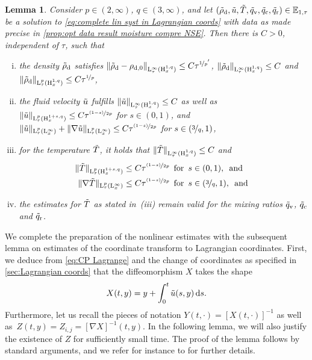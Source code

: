 \documentclass[10pt]{amsart}
\theoremstyle{plain}
\newtheorem{lem}[lem]{Lemma}
\theoremstyle{definition}
\theoremstyle{thm}
\numberwithin{equation}{section}
\newcommand{\rL}{\mathrm{L}}
\newcommand{\rH}{\mathrm{H}}
\newcommand{\E}{\mathbb{E}}
\newcommand{\srd}{\, \mathrm{d}}
\newcommand{\tand}{\enspace \text{and} \enspace}
\newcommand{\tfor}{\enspace \text{for} \enspace}
\newcommand{\rd}{\mathrm{d}}
\newcommand{\rr}{\mathrm{r}}
\newcommand{\rv}{\mathrm{v}}
\newcommand{\rc}{\mathrm{c}}
\newcommand{\trho}{\Tilde{\rho}}
\newcommand{\tu}{\Tilde{u}}
\newcommand{\tT}{\Tilde{T}}
\newcommand{\tq}{\Tilde{q}}
\begin{document}
\begin{lem}\label{lem:ests of vars}
Consider $p \in (2,\infty)$, $q \in (3,\infty)$, and let $(\trho_\rd,\tu,\tT,\tq_\rv,\tq_\rc,\tq_\rr) \in \E_{1,\tau}$ be a solution to \eqref{eq:complete lin syst in Lagrangian coords} with data as made precise in \autoref{prop:opt data result moisture compre NSE}.
Then there is $C > 0$, independent of $\tau$, such that
\begin{enumerate}[(i)]
    \item the density $\trho_\rd$ satisfies $\| \trho_\rd -\rho_{\rd,0} \|_{\rL_\tau^\infty(\rH_x^{1,q})} \le C \tau ^{\nicefrac{1}{p^{'}}}$, $\| \trho_\rd \|_{\rL_\tau^\infty(\rH_x^{1,q})} \le C$ and $\| \trho_\rd \|_{\rL_\tau^p(\rH_x^{1,q})} \le C \tau^{\nicefrac{1}{p}}$,
    \item the fluid velocity $\tu$ fulfills $\| \tu \|_{\rL_\tau^\infty(\rH_x^{1,q})} \le C$ as well as $\| \tu \|_{\rL_\tau^p(\rH_x^{1+s,q})} \le C \tau^{\nicefrac{(1-s)}{2p}}$ for $s \in (0,1)$, and $\| \tu \|_{\rL_\tau^p(\rL_x^\infty)} + \| \nabla \tu \|_{\rL_\tau^p(\rL_x^\infty)} \le C \tau^{\nicefrac{(1-s)}{2p}}$ for $s \in (\nicefrac{3}{q},1)$,
    \item for the temperature $\tT$, it holds that $\| \tT \|_{\rL_\tau^\infty(\rH_x^{1,q})} \le C$ and
    \begin{equation*}
        \begin{aligned}
            \| \tT \|_{\rL_\tau^p(\rH_x^{1+s,q})} 
            &\le C \tau^{\nicefrac{(1-s)}{2p}} \tfor s \in (0,1), \tand\\
            \| \nabla \tT \|_{\rL_\tau^p(\rL_x^\infty)} 
            &\le C \tau^{\nicefrac{(1-s)}{2p}} \tfor s \in (\nicefrac{3}{q},1), \tand
        \end{aligned}
    \end{equation*}    
    \item the estimates for $\tT$ as stated in~(iii) remain valid for the mixing ratios $\tq_\rv$, $\tq_\rc$ and $\tq_\rr$.
\end{enumerate}
\end{lem}

We complete the preparation of the nonlinear estimates with the subsequent lemma on estimates of the coordinate transform to Lagrangian coordinates.
First, we deduce from \eqref{eq:CP Lagrange} and the change of coordinates as specified in \autoref{sec:Lagrangian coords} that the diffeomorphism $X$ takes the shape
\begin{equation}\label{eq:shape of X}
    X(t,y) = y + \int_0^t \tu(s,y) \srd s.
\end{equation}
Furthermore, let us recall the pieces of notation $Y(t,\cdot) = [X(t,\cdot)]^{-1}$ as well as~$Z(t,y) = Z_{i,j} = [\nabla X]^{-1}(t,y)$.
In the following lemma, we will also justify the existence of $Z$ for sufficiently small time.
The proof of the lemma follows by standard arguments, and we refer for instance to \cite[Sec.~2.3]{HMTT:19} for further details.
\end{document}
